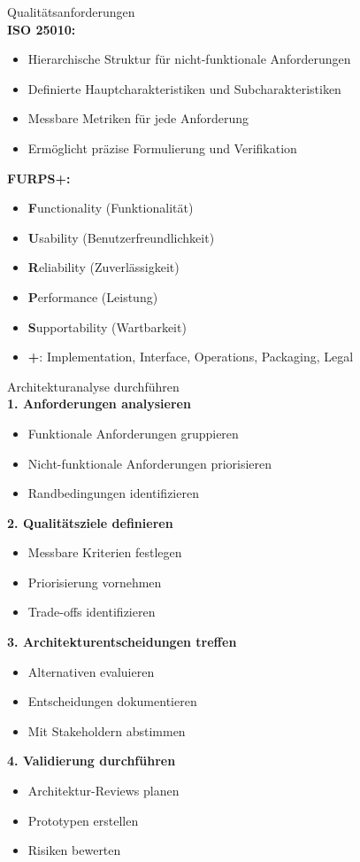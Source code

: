 \begin{theorem}{Qualitätsanforderungen}\\
\textbf{ISO 25010:}
\begin{itemize}
    \item Hierarchische Struktur für nicht-funktionale Anforderungen
    \item Definierte Hauptcharakteristiken und Subcharakteristiken
    \item Messbare Metriken für jede Anforderung
    \item Ermöglicht präzise Formulierung und Verifikation
\end{itemize}

\textbf{FURPS+:}
\begin{itemize}
    \item \textbf{F}unctionality (Funktionalität)
    \item \textbf{U}sability (Benutzerfreundlichkeit)
    \item \textbf{R}eliability (Zuverlässigkeit)
    \item \textbf{P}erformance (Leistung)
    \item \textbf{S}upportability (Wartbarkeit)
    \item \textbf{+}: Implementation, Interface, Operations, Packaging, Legal
\end{itemize}
\end{theorem}

\begin{KR}{Architekturanalyse durchführen}\\
\textbf{1. Anforderungen analysieren}
\begin{itemize}
    \item Funktionale Anforderungen gruppieren
    \item Nicht-funktionale Anforderungen priorisieren
    \item Randbedingungen identifizieren
\end{itemize}

\textbf{2. Qualitätsziele definieren}
\begin{itemize}
    \item Messbare Kriterien festlegen
    \item Priorisierung vornehmen
    \item Trade-offs identifizieren
\end{itemize}

\textbf{3. Architekturentscheidungen treffen}
\begin{itemize}
    \item Alternativen evaluieren
    \item Entscheidungen dokumentieren
    \item Mit Stakeholdern abstimmen
\end{itemize}

\textbf{4. Validierung durchführen}
\begin{itemize}
    \item Architektur-Reviews planen
    \item Prototypen erstellen
    \item Risiken bewerten
\end{itemize}
\end{KR}

